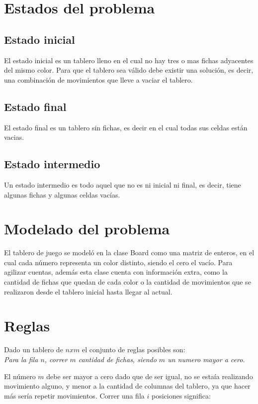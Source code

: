 \documentclass[%
    final,
    reprint,
    notitlepage,
    narroweqnarray,
    inline,
    twoside,
    invited
    ]{ieee}
\begin{document}
\section{Estados del problema}
\subsection{Estado inicial}
\par El estado inicial es un tablero lleno en el cual no hay tres o mas fichas adyacentes del mismo color. Para que el tablero sea v\'alido debe existir una soluci\'on, es decir, una combinaci\'on de movimientos que lleve a vaciar el tablero.
\subsection{Estado final}
\par El estado final es un tablero sin fichas, es decir en el cual todas sus celdas est\'an vacias.
\subsection{Estado intermedio}
\par Un estado intermedio es todo aquel que no es ni inicial ni final, es decir, tiene algunas fichas y algunas celdas vac\'ias.
\section{Modelado del problema}
\par El tablero de juego se model\'o en la clase Board como una matriz de enteros, en el cual cada n\'umero representa un color distinto, siendo el cero el vac\'io. Para agilizar cuentas, adem\'as esta clase cuenta con informaci\'on extra, como la cantidad de fichas que quedan de cada color o la cantidad de movimientos que se realizaron desde el tablero inicial hasta llegar al actual.
\section{Reglas}
\par Dado un tablero de $n x m$ el conjunto de reglas posibles son:\\

\emph{Para la fila $n$, correr $m$ cantidad de fichas, siendo $m$ un numero mayor a cero.}\\
\par El n\'umero $m$ debe ser mayor a cero dado que de ser igual, no se esta\'ia realizando movimiento alguno, y menor a la cantidad de columnas del tablero, ya que hacer m\'as ser\'ia repetir movimientos. Correr una fila $i$ posiciones significa:\\
\end{document}
